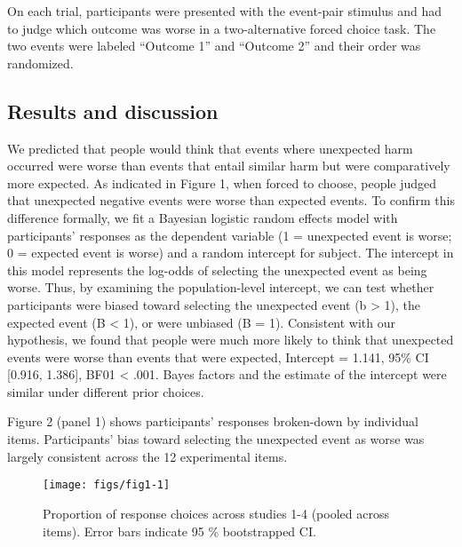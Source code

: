 \documentclass[10pt, letterpaper]{article}
\newenvironment{CodeChunk}{}{}
\begin{document}
On each trial, participants were presented with the event-pair stimulus
and had to judge which outcome was worse in a two-alternative forced
choice task. The two events were labeled ``Outcome 1'' and ``Outcome 2''
and their order was randomized.

\subsection{Results and discussion}\label{results-and-discussion}

We predicted that people would think that events where unexpected harm
occurred were worse than events that entail similar harm but were
comparatively more expected. As indicated in Figure 1, when forced to
choose, people judged that unexpected negative events were worse than
expected events. To confirm this difference formally, we fit a Bayesian
logistic random effects model with participants' responses as the
dependent variable (1 = unexpected event is worse; 0 = expected event is
worse) and a random intercept for subject. The intercept in this model
represents the log-odds of selecting the unexpected event as being
worse. Thus, by examining the population-level intercept, we can test
whether participants were biased toward selecting the unexpected event
(b \textgreater{} 1), the expected event (B \textless{} 1), or were
unbiased (B = 1). Consistent with our hypothesis, we found that people
were much more likely to think that unexpected events were worse than
events that were expected, Intercept = 1.141, 95\% CI {[}0.916,
1.386{]}, BF01 \textless{} .001. Bayes factors and the estimate of the
intercept were similar under different prior choices.

Figure 2 (panel 1) shows participants' responses broken-down by
individual items. Participants' bias toward selecting the unexpected
event as worse was largely consistent across the 12 experimental items.

\begin{CodeChunk}
\begin{figure}[H]

{\centering \texttt{[image: figs/fig1-1]} 

}

\caption[Proportion of response choices across studies 1-4 (pooled across items)]{Proportion of response choices across studies 1-4 (pooled across items). Error bars indicate 95 \% bootstrapped CI.}\label{fig:fig1}
\end{figure}
\end{CodeChunk}
\end{document}
